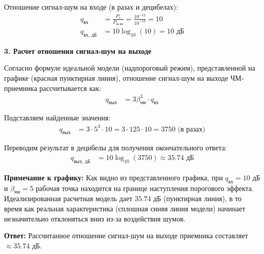 Отношение сигнал-шум на входе (в разах и децибелах):
\begin{align*}
    q_{\text{вх}} &= \frac{P_c}{P_{\text{ш.вх}}} = \frac{10^{-12}}{10^{-13}} = 10 \\
    q_{\text{вх, дБ}} &= 10 \log_{10}(10) = 10 \text{ дБ}
\end{align*}

\vspace{1em}
\textbf{3. Расчет отношения сигнал-шум на выходе}

Согласно формуле идеальной модели (надпороговый режим), представленной на графике (красная пунктирная линия), отношение сигнал-шум на выходе ЧМ-приемника рассчитывается как:
\begin{align*}
    q_{\text{вых}} &= 3 \beta_{\text{чм}}^3 \cdot q_{\text{вх}}
\end{align*}

Подставляем найденные значения:
\begin{align*}
    q_{\text{вых}} &= 3 \cdot 5^3 \cdot 10 = 3 \cdot 125 \cdot 10 = 3750 \text{ (в разах)}
\end{align*}

Переводим результат в децибелы для получения окончательного ответа:
\begin{align*}
    q_{\text{вых, дБ}} &= 10 \log_{10}(3750) \approx 35.74 \text{ дБ}
\end{align*}

\textbf{Примечание к графику:}
Как видно из представленного графика, при $q_{\text{вх}} = 10 \text{ дБ}$ и $\beta_{\text{чм}} = 5$ рабочая точка находится на границе наступления порогового эффекта. Идеализированная расчетная модель дает $35.74 \text{ дБ}$ (пунктирная линия), в то время как реальная характеристика (сплошная синяя линия модели) начинает незначительно отклоняться вниз из-за воздействия шумов.

\textbf{Ответ:} Рассчитанное отношение сигнал-шум на выходе приемника составляет $\approx 35.74 \text{ дБ}$.